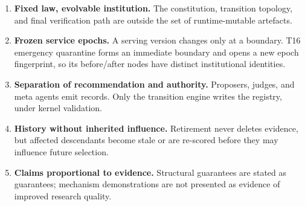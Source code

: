 \begin{enumerate}
  \item \textbf{Fixed law, evolvable institution.} The constitution,
        transition topology, and final verification path are outside the
        set of runtime-mutable artefacts.
  \item \textbf{Frozen service epochs.} A serving version changes only at a
        boundary. T16 emergency quarantine forms an immediate boundary and
        opens a new epoch fingerprint, so its before/after nodes have
        distinct institutional identities.
  \item \textbf{Separation of recommendation and authority.} Proposers,
        judges, and meta agents emit records. Only the transition engine
        writes the registry, under kernel validation.
  \item \textbf{History without inherited influence.} Retirement never
        deletes evidence, but affected descendants become stale or are
        re-scored before they may influence future selection.
  \item \textbf{Claims proportional to evidence.} Structural guarantees
        are stated as guarantees; mechanism demonstrations are not
        presented as evidence of improved research quality.
\end{enumerate}
